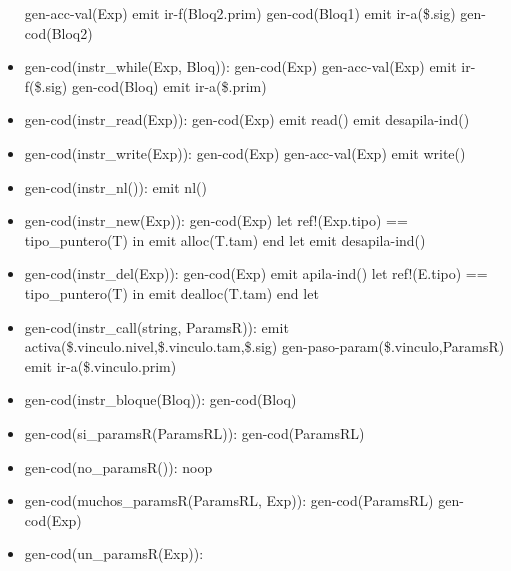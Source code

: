 \documentclass[11pt]{article}
\begin{document}
\begin{itemize}
                \subitem gen-acc-val(Exp)
                \subitem emit ir-f(Bloq2.prim)
                \subitem gen-cod(Bloq1)
                \subitem emit ir-a(\$.sig)
                \subitem gen-cod(Bloq2)
            \item gen-cod(instr\_while(Exp, Bloq)): 
                \subitem gen-cod(Exp)
                \subitem gen-acc-val(Exp)
                \subitem emit ir-f(\$.sig)
                \subitem gen-cod(Bloq)
                \subitem emit ir-a(\$.prim)
            \item gen-cod(instr\_read(Exp)): 
                \subitem gen-cod(Exp)
                \subitem emit read()
                \subitem emit desapila-ind()
            \item gen-cod(instr\_write(Exp)): 
                \subitem gen-cod(Exp)
                \subitem gen-acc-val(Exp)
                \subitem emit write()
            \item gen-cod(instr\_nl()): 
                \subitem emit nl()
            \item gen-cod(instr\_new(Exp)): 
                \subitem gen-cod(Exp)
                \subitem let ref!(Exp.tipo) == tipo\_puntero(T) in
                    \subsubitem emit alloc(T.tam)
                \subitem end let
                \subitem emit desapila-ind()
            \item gen-cod(instr\_del(Exp)): 
                \subitem gen-cod(Exp)
                \subitem emit apila-ind()
                \subitem let ref!(E.tipo) == tipo\_puntero(T) in
                    \subsubitem emit dealloc(T.tam)
                \subitem end let
            \item gen-cod(instr\_call(string, ParamsR)): 
                \subitem emit activa(\$.vinculo.nivel,\$.vinculo.tam,\$.sig)
                \subitem gen-paso-param(\$.vinculo,ParamsR)
                \subitem emit ir-a(\$.vinculo.prim)
            \item gen-cod(instr\_bloque(Bloq)): 
                \subitem gen-cod(Bloq)
            \item gen-cod(si\_paramsR(ParamsRL)): 
                \subitem gen-cod(ParamsRL)
            \item gen-cod(no\_paramsR()): 
                \subitem noop 
            \item gen-cod(muchos\_paramsR(ParamsRL, Exp)): 
                \subitem gen-cod(ParamsRL)
                \subitem gen-cod(Exp)
            \item gen-cod(un\_paramsR(Exp)): 

\end{itemize}
\end{document}
